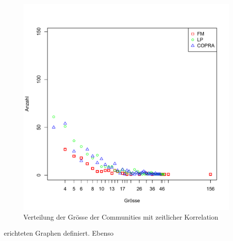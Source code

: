 \begin{figure}[h]
  \centering
  \includegraphics[scale=0.8]{images/time_corr_dist.pdf}
  \caption{Verteilung der Gr\"osse der Communities mit zeitlicher Korrelation}
  \label{fig:time-corr-dist}
\end{figure}


erichteten Graphen definiert. Ebenso 

